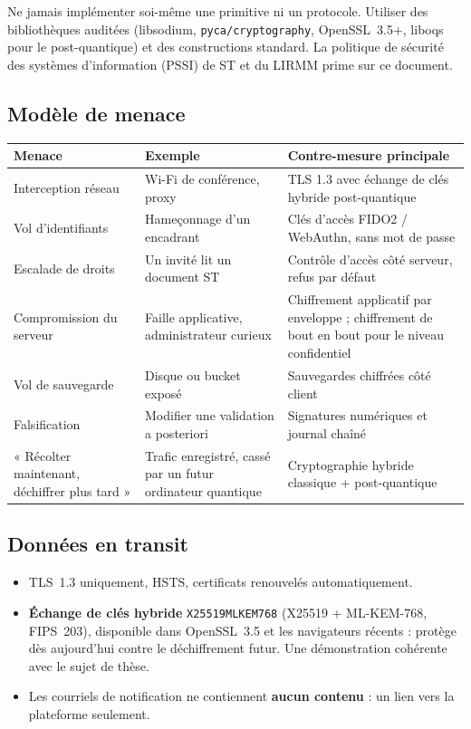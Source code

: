 \documentclass[11pt,a4paper]{article}
\begin{document}
\begin{apretenir}[Règle d'or]
Ne jamais implémenter soi-même une primitive ni un protocole. Utiliser des
bibliothèques auditées (libsodium, \texttt{pyca/cryptography}, OpenSSL~3.5+,
liboqs pour le post-quantique) et des constructions standard. La politique de
sécurité des systèmes d'information (PSSI) de ST et du LIRMM prime sur ce document.
\end{apretenir}

\subsection{Modèle de menace}
\begin{center}\small
\begin{tabularx}{\linewidth}{P{4.2cm} L P{4.6cm}}
\toprule
\textbf{Menace} & \textbf{Exemple} & \textbf{Contre-mesure principale}\\
\midrule
Interception réseau & Wi-Fi de conférence, proxy & TLS 1.3 avec échange de clés hybride post-quantique\\
Vol d'identifiants & Hameçonnage d'un encadrant & Clés d'accès FIDO2 / WebAuthn, sans mot de passe\\
Escalade de droits & Un invité lit un document ST & Contrôle d'accès côté serveur, refus par défaut\\
Compromission du serveur & Faille applicative, administrateur curieux & Chiffrement applicatif par enveloppe ; chiffrement de bout en bout pour le niveau confidentiel\\
Vol de sauvegarde & Disque ou bucket exposé & Sauvegardes chiffrées côté client\\
Falsification & Modifier une validation a posteriori & Signatures numériques et journal chaîné\\
« Récolter maintenant, déchiffrer plus tard » & Trafic enregistré, cassé par un futur ordinateur quantique & Cryptographie hybride classique + post-quantique\\
\bottomrule
\end{tabularx}
\end{center}

\subsection{Données en transit}
\begin{itemize}
  \item TLS~1.3 uniquement, HSTS, certificats renouvelés automatiquement.
  \item \textbf{Échange de clés hybride} \texttt{X25519MLKEM768} (X25519 + ML-KEM-768,
  FIPS~203), disponible dans OpenSSL~3.5 et les navigateurs récents : protège dès
  aujourd'hui contre le déchiffrement futur. Une démonstration cohérente avec le sujet
  de thèse.
  \item Les courriels de notification ne contiennent \textbf{aucun contenu} : un lien
  vers la plateforme seulement.
\end{itemize}
\end{document}
